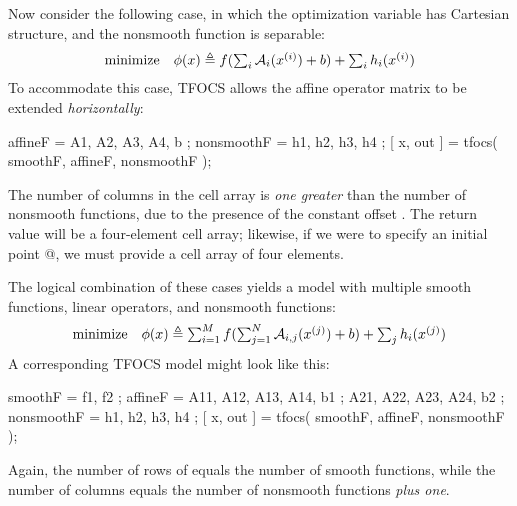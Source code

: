 \documentclass{article}
\begin{document}
Now consider the following case, in which the optimization variable has
Cartesian structure, and the nonsmooth function is separable:
\begin{equation}
	\begin{array}{ll}
		\text{minimize} & \phi(x) \triangleq f(\sum_i\mathcal{A}_i(x^{(i)})+b) + \sum_i h_i(x^{(i)})
	\end{array}		
\end{equation}
To accommodate this case, TFOCS allows the affine operator matrix
to be extended \emph{horizontally}:
\begin{code}
	affineF = { A1, A2, A3, A4, b };
	nonsmoothF = { h1, h2, h3, h4 };
	[ x, out ] = tfocs( smoothF, affineF, nonsmoothF );
\end{code}
The number of columns in the cell array is
\emph{one greater} than the number of nonsmooth functions, due to the
presence of the constant offset \verb@b@. The return value \verb@x@ 
will be a four-element cell array; likewise, if we were to specify
an initial point @, we must provide a cell
array of four elements.

The logical combination of these cases yields a model
with multiple smooth functions, linear operators, and
nonsmooth functions:
\begin{equation}
	\begin{array}{ll}
		\text{minimize} & \phi(x) \triangleq \sum_{i=1}^M f(\sum_{j=1}^N \mathcal{A}_{i,j}(x^{(j)})+b) + \sum_j h_i(x^{(j)})
	\end{array}		
\end{equation}
A corresponding TFOCS model might look like this:
\begin{code}
	smoothF = { f1, f2 };
	affineF = { A11, A12, A13, A14, b1 ; A21, A22, A23, A24, b2 };
	nonsmoothF = { h1, h2, h3, h4 };
	[ x, out ] = tfocs( smoothF, affineF, nonsmoothF );
\end{code}
Again, the number of rows of \verb@affineF@ equals the number of
smooth functions, while
the number of columns equals the number of nonsmooth
functions \emph{plus one}.
\end{document}
